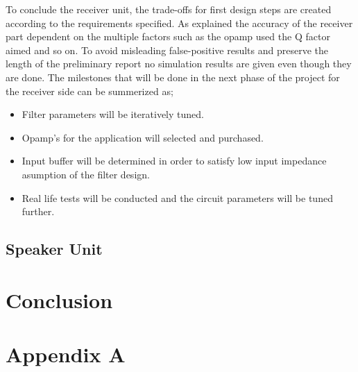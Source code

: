 \documentclass[letterpaper,12pt]{article}
\begin{document}
To conclude the receiver unit, the trade-offs for first design steps are created according to the requirements specified. As explained the accuracy of the receiver part dependent on the multiple factors such as the opamp used the Q factor aimed and so on. To avoid misleading false-positive results and preserve the length of the preliminary report no simulation results are given even though they are done. The milestones that will be done in the next phase of the project for the receiver side can be summerized as;
\begin{itemize}
    \item Filter parameters will be iteratively tuned.
    \item Opamp's for the application will selected and purchased.
    \item Input buffer will be determined in order to satisfy low input impedance asumption of the filter design.
    \item Real life tests will be conducted and the circuit parameters will be tuned further.
\end{itemize}
\subsection{Speaker Unit}

\section{Conclusion}
\section*{Appendix A}
\end{document}
